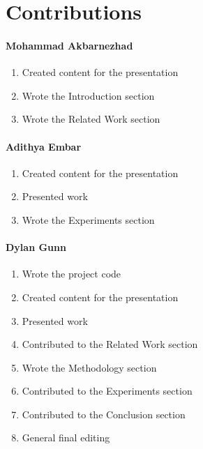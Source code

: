 \section{Contributions}

\paragraph{Mohammad Akbarnezhad}
\begin{enumerate}
    \item Created content for the presentation
    \item Wrote the Introduction section
    \item Wrote the Related Work section
\end{enumerate}

\paragraph{Adithya Embar}
\begin{enumerate}
    \item Created content for the presentation
    \item Presented work
    \item Wrote the Experiments section
\end{enumerate}

\paragraph{Dylan Gunn}
\begin{enumerate}
    \item Wrote the project code
    \item Created content for the presentation
    \item Presented work
    \item Contributed to the Related Work section
    \item Wrote the Methodology section
    \item Contributed to the Experiments section
    \item Contributed to the Conclusion section
    \item General final editing

\end{enumerate}

